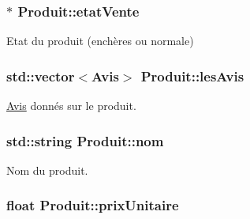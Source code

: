 \hypertarget{class_produit_af2965a92ffaf42af6e0a67951f9d44f7}{
\subsubsection[{etat\-Vente}]{$\ast$ Produit\-::etat\-Vente\hspace{0.3cm}{\ttfamily [protected]}}}\label{class_produit_af2965a92ffaf42af6e0a67951f9d44f7}


Etat du produit (enchères ou normale) 

\hypertarget{class_produit_a0de1409220ab37c7d582772912c88ac7}{
\subsubsection[{les\-Avis}]{\setlength{\rightskip}{0pt plus 5cm}std\-::vector$<${\bf Avis}$>$ Produit\-::les\-Avis\hspace{0.3cm}{\ttfamily [protected]}}}\label{class_produit_a0de1409220ab37c7d582772912c88ac7}


\hyperlink{class_avis}{Avis} donnés sur le produit. 

\hypertarget{class_produit_acb895352487797b4b9189b8fde1f8c58}{
\subsubsection[{nom}]{\setlength{\rightskip}{0pt plus 5cm}std\-::string Produit\-::nom\hspace{0.3cm}{\ttfamily [protected]}}}\label{class_produit_acb895352487797b4b9189b8fde1f8c58}


Nom du produit. 

\hypertarget{class_produit_ac4432cc25a56757fce7300232046243a}{
\subsubsection[{prix\-Unitaire}]{\setlength{\rightskip}{0pt plus 5cm}float Produit\-::prix\-Unitaire\hspace{0.3cm}{\ttfamily [protected]}}}\label{class_produit_ac4432cc25a56757fce7300232046243a}


